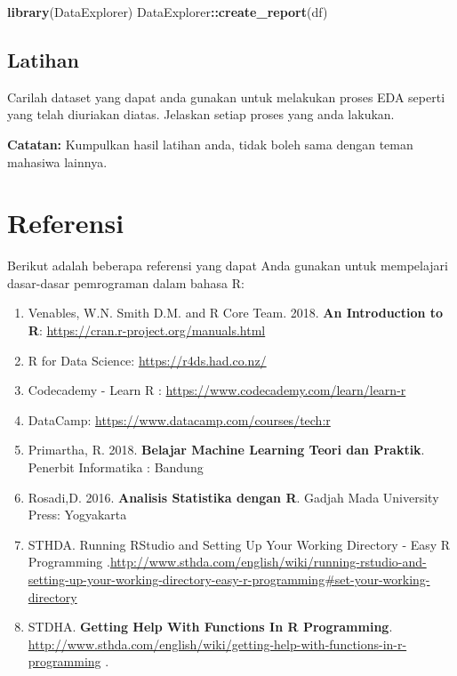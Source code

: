 \documentclass[
]{book}
\newenvironment{Shaded}{\begin{snugshade}}{\end{snugshade}}
\newcommand{\FunctionTok}[1]{\textcolor[rgb]{0.13,0.29,0.53}{\textbf{#1}}}
\newcommand{\NormalTok}[1]{#1}
\newcommand{\SpecialCharTok}[1]{\textcolor[rgb]{0.81,0.36,0.00}{\textbf{#1}}}
\providecommand{\tightlist}{%
  \setlength{\itemsep}{0pt}\setlength{\parskip}{0pt}}
\begin{document}
\begin{Shaded}
\begin{Highlighting}[]
\FunctionTok{library}\NormalTok{(DataExplorer)}
\NormalTok{DataExplorer}\SpecialCharTok{::}\FunctionTok{create\_report}\NormalTok{(df)}
\end{Highlighting}
\end{Shaded}

\hypertarget{latihan-7}{%
\section{Latihan}\label{latihan-7}}

Carilah dataset yang dapat anda gunakan untuk melakukan proses EDA seperti yang telah diuriakan diatas. Jelaskan setiap proses yang anda lakukan.

\textbf{Catatan:} Kumpulkan hasil latihan anda, tidak boleh sama dengan teman mahasiwa lainnya.

\hypertarget{referensi}{%
\chapter{Referensi}\label{referensi}}

Berikut adalah beberapa referensi yang dapat Anda gunakan untuk mempelajari dasar-dasar pemrograman dalam bahasa R:

\begin{enumerate}
\def\labelenumi{\arabic{enumi}.}
\tightlist
\item
  Venables, W.N. Smith D.M. and R Core Team. 2018. \textbf{An Introduction to R}: \url{https://cran.r-project.org/manuals.html}
\item
  R for Data Science: \url{https://r4ds.had.co.nz/}
\item
  Codecademy - Learn R : \url{https://www.codecademy.com/learn/learn-r}
\item
  DataCamp: \url{https://www.datacamp.com/courses/tech:r}
\item
  Primartha, R. 2018. \textbf{Belajar Machine Learning Teori dan Praktik}. Penerbit Informatika : Bandung
\item
  Rosadi,D. 2016. \textbf{Analisis Statistika dengan R}. Gadjah Mada University Press: Yogyakarta
\item
  STHDA. Running RStudio and Setting Up Your Working Directory - Easy R Programming .\url{http://www.sthda.com/english/wiki/running-rstudio-and-setting-up-your-working-directory-easy-r-programming\#set-your-working-directory}
\item
  STDHA. \textbf{Getting Help With Functions In R Programming}. \url{http://www.sthda.com/english/wiki/getting-help-with-functions-in-r-programming} .
\end{enumerate}

  
\end{document}
